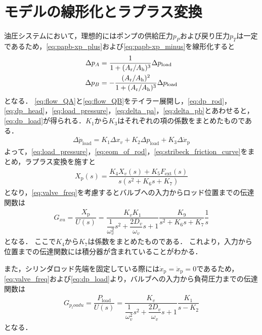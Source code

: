 \section{モデルの線形化とラプラス変換}
油圧システムにおいて，理想的にはポンプの供給圧力$p_P$および戻り圧力$p_T$は一定であるため，\eqnname\ref{eq:papb-xp_plus}および\eqnname\ref{eq:papb-xp_minus}を線形化すると
\begin{align}
    \label{eq:delta_pa}
    \Delta p_A &= \dfrac{1}{1+(A_\mathrm{r}/A_\mathrm{h})^3} \Delta p_\mathrm{load}\\
    \label{eq:delta_pb}
    \Delta p_B &= -\dfrac{(A_\mathrm{r}/A_\mathrm{h})^2}{1+(A_\mathrm{r}/A_\mathrm{h})^3} \Delta p_\mathrm{load}
\end{align}
となる．
\eqnname\ref{eq:flow_QA}と\eqnname\ref{eq:flow_QB}をテイラー展開し，\eqnname\ref{eq:dp_rod}，\eqnname\ref{eq:dp_head}，\eqnname\ref{eq:load_pressure}，\eqnname\ref{eq:delta_pa}，\eqnname\ref{eq:delta_pb}とあわせると，\eqnname\ref{eq:dp_load}が得られる．$K_1$から$K_3$はそれぞれの項の係数をまとめたものである．
\begin{align}
    \label{eq:dp_load}
    \Delta \dot{p}_\mathrm{load} = K_1 \Delta x_v +K_2 \Delta p_\mathrm{load} +K_3 \Delta \dot{x}_\mathrm{p}
\end{align}
よって，\eqnname\ref{eq:load_pressure}，\eqnname\ref{eq:eom_of_rod}，\eqnname\ref{eq:stribeck_friction_curve}をまとめ，ラプラス変換を施すと
\begin{align}
    \label{<label>}
    X_\mathrm{p}(s) = \dfrac{K_4 X_v(s)+K_5 F_\mathrm{ext}(s)}{s(s^2 + K_6s + K_7)}
\end{align}
となり，\eqnname\ref{eq:valve_freq}を考慮するとバルブへの入力からロッド位置までの伝達関数は
\begin{align}
    \label{eq:tf_Gxu}
    G_{xu} = \dfrac{X_\mathrm{p}}{U(s)} = \dfrac{K_vK_1}{\dfrac{1}{\omega_v^2}s^2 + \dfrac{2D_v}{\omega_v}s + 1} \dfrac{K_9}{s^2 + K_6s + K_7} \dfrac{1}{s}
\end{align}
となる．
ここで$K_4$から$K_7$は係数をまとめたものである．
これより，入力から位置までの伝達関数には積分器が含まれていることがわかる．

また，シリンダロッド先端を固定している際には$\dot{x}_\mathrm{p}=\ddot{x}_\mathrm{p}=0$であるため，\eqnname\ref{eq:valve_freq}および\eqnname\ref{eq:dp_load}より，バルブへの入力から負荷圧力までの伝達関数は
\begin{align}
    \label{eq:tf_Gpu}
    G_{p_load u} = \dfrac{P_\mathrm{load}}{U(s)} = \dfrac{K_v}{\dfrac{1}{\omega_v^2}s^2 + \dfrac{2D_v}{\omega_v}s + 1}\dfrac{K_1}{s-K_2}
\end{align}
となる．

























